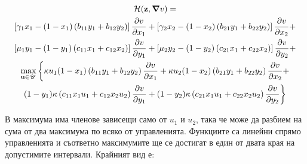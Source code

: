 \begin{multline}
  \label{eq:HamiltonianFull}
  \mathcal{H}(\mathbf{z}, \grad{v}) = \\
  \left[\gamma_1 x_1 - (1-x_1) \left(b_{11} y_1 + b_{12} y_2\right) \right] \pdv{v}{x_1} +
  \left[\gamma_2 x_2 - (1-x_2) \left(b_{21} y_1 + b_{22} y_2\right) \right] \pdv{v}{x_2} + \\
  \left[\mu_1 y_1 - (1-y_1) \left(c_{11} x_1 + c_{12} x_2\right) \right] \pdv{v}{y_1} +
  \left[\mu_2 y_2 - (1-y_2) \left(c_{21} x_1 + c_{22} x_2\right)\right] \pdv{v}{y_2} + \\
  \max_{\mathbf{u} \in \mathscr{U}} \bigg\{\kappa u_1(1-x_1) \left(b_{11} y_1 + b_{12} y_2\right) \pdv{v}{x_1} +
    \kappa u_2 (1-x_2) \left(b_{21} y_1 + b_{22} y_2\right) \pdv{v}{x_2} + \\
    (1-y_1) \kappa \left(c_{11} x_1 u_1 + c_{12} x_2 u_2 \right) \pdv{v}{y_1}+
  (1-y_2) \kappa \left(c_{21} x_1 u_1 + c_{22} x_2 u_2 \right) \pdv{v}{y_2}\bigg\}
\end{multline}

В максимума има членове зависещи само от $u_1$ и $u_2$, така че може да разбием на сума от два максимума по всяко от управленията. Функциите са линейни спрямо управленията и съответно максимумите ще се достигат в един от двата края на допустимите интервали. Крайният вид е:

